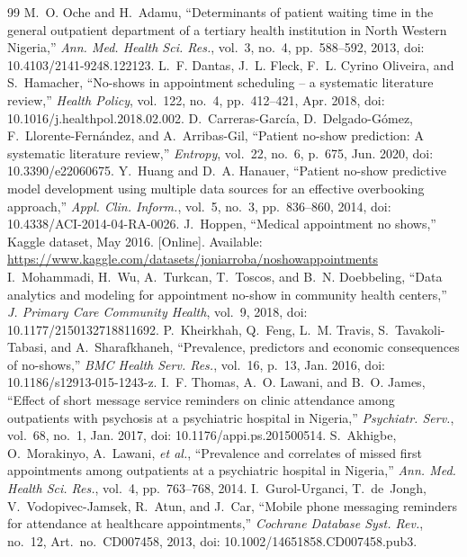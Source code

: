 \documentclass[journal]{IEEEtran}
\begin{document}
\begin{thebibliography}{99}
 M.~O. Oche and H.~Adamu, ``Determinants of patient waiting time in the general outpatient department of a tertiary health institution in North Western Nigeria,'' \emph{Ann. Med. Health Sci. Res.}, vol.~3, no.~4, pp.~588--592, 2013, doi: 10.4103/2141-9248.122123.
 L.~F. Dantas, J.~L. Fleck, F.~L. Cyrino Oliveira, and S.~Hamacher, ``No-shows in appointment scheduling -- a systematic literature review,'' \emph{Health Policy}, vol.~122, no.~4, pp.~412--421, Apr. 2018, doi: 10.1016/j.healthpol.2018.02.002.
 D.~Carreras-Garc\'ia, D.~Delgado-G\'omez, F.~Llorente-Fern\'andez, and A.~Arribas-Gil, ``Patient no-show prediction: A systematic literature review,'' \emph{Entropy}, vol.~22, no.~6, p.~675, Jun. 2020, doi: 10.3390/e22060675.
 Y.~Huang and D.~A. Hanauer, ``Patient no-show predictive model development using multiple data sources for an effective overbooking approach,'' \emph{Appl. Clin. Inform.}, vol.~5, no.~3, pp.~836--860, 2014, doi: 10.4338/ACI-2014-04-RA-0026.
 J.~Hoppen, ``Medical appointment no shows,'' Kaggle dataset, May 2016. [Online]. Available: \url{https://www.kaggle.com/datasets/joniarroba/noshowappointments}
 I.~Mohammadi, H.~Wu, A.~Turkcan, T.~Toscos, and B.~N. Doebbeling, ``Data analytics and modeling for appointment no-show in community health centers,'' \emph{J. Primary Care Community Health}, vol.~9, 2018, doi: 10.1177/2150132718811692.
 P.~Kheirkhah, Q.~Feng, L.~M. Travis, S.~Tavakoli-Tabasi, and A.~Sharafkhaneh, ``Prevalence, predictors and economic consequences of no-shows,'' \emph{BMC Health Serv. Res.}, vol.~16, p.~13, Jan. 2016, doi: 10.1186/s12913-015-1243-z.
 I.~F. Thomas, A.~O. Lawani, and B.~O. James, ``Effect of short message service reminders on clinic attendance among outpatients with psychosis at a psychiatric hospital in Nigeria,'' \emph{Psychiatr. Serv.}, vol.~68, no.~1, Jan. 2017, doi: 10.1176/appi.ps.201500514.
 S.~Akhigbe, O.~Morakinyo, A.~Lawani, \emph{et al.}, ``Prevalence and correlates of missed first appointments among outpatients at a psychiatric hospital in Nigeria,'' \emph{Ann. Med. Health Sci. Res.}, vol.~4, pp.~763--768, 2014.
 I.~Gurol-Urganci, T.~de~Jongh, V.~Vodopivec-Jamsek, R.~Atun, and J.~Car, ``Mobile phone messaging reminders for attendance at healthcare appointments,'' \emph{Cochrane Database Syst. Rev.}, no.~12, Art.~no.~CD007458, 2013, doi: 10.1002/14651858.CD007458.pub3.

\end{thebibliography}
\end{document}
